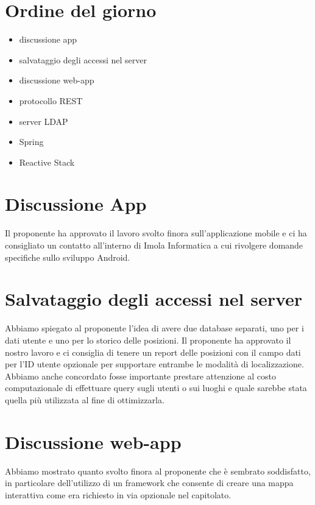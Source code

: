 \documentclass{article}
\begin{document}
\section{Ordine del giorno}%
\label{sec:ordine_del_giorno}

\begin{itemize}
  \item discussione app
  \item salvataggio degli accessi nel server
  \item discussione web-app
  \item protocollo REST
  \item server LDAP
  \item Spring
  \item Reactive Stack
\end{itemize}

\section{Discussione App}%
\label{sec:discussione_app}
Il proponente ha approvato il lavoro svolto finora sull'applicazione mobile e ci ha consigliato un contatto all'interno di Imola Informatica a cui rivolgere domande specifiche sullo sviluppo Android.

\section{Salvataggio degli accessi nel server}%
\label{sec:salvataggio_accessi_server}
Abbiamo spiegato al proponente l'idea di avere due database separati, uno per i dati utente e uno per lo storico delle posizioni.
Il proponente ha approvato il nostro lavoro e ci consiglia di tenere un report delle posizioni con il campo dati per l'ID utente opzionale per supportare entrambe le modalità di localizzazione.
Abbiamo anche concordato fosse importante prestare attenzione al costo computazionale di effettuare query sugli utenti o sui luoghi e quale sarebbe stata quella più utilizzata al fine di ottimizzarla.

\section{Discussione web-app}%
\label{sec:discussione_web_app}
Abbiamo mostrato quanto svolto finora al proponente che è sembrato soddisfatto, in particolare dell'utilizzo di un framework che consente di creare una mappa interattiva come era richiesto in via opzionale nel capitolato.
\end{document}
